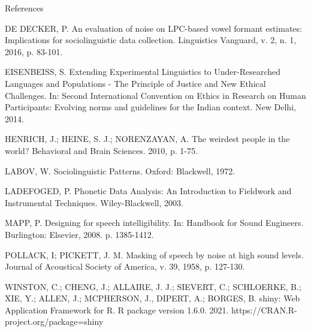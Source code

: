 \vspace{1cm}

References

DE DECKER, P. An evaluation of noise on LPC-based vowel formant estimates: Implications for sociolinguistic data collection. Linguistics Vanguard, v. 2, n. 1, 2016, p. 83-101. 

EISENBEISS, S. Extending Experimental Linguistics to Under-Researched Languages and Populations - The Principle of Justice and New Ethical Challenges. In: Second International Convention on Ethics in Research on Human Participants: Evolving norms and guidelines for the Indian context. New Delhi, 2014.

HENRICH, J.; HEINE, S. J.; NORENZAYAN, A. The weirdest people in the world? Behavioral and Brain Sciences. 2010, p. 1-75.

LABOV, W. Sociolinguistic Patterns. Oxford: Blackwell, 1972.

LADEFOGED, P. Phonetic Data Analysis: An Introduction to Fieldwork and Instrumental Techniques. Wiley-Blackwell, 2003.

MAPP, P. Designing for speech intelligibility. In: Handbook for Sound Engineers. Burlington: Elsevier, 2008. p. 1385-1412.

POLLACK, I; PICKETT, J. M. Masking of speech by noise at high sound levels. Journal of Acoustical Society of America, v. 39, 1958, p. 127-130. 

WINSTON, C.; CHENG, J.; ALLAIRE, J. J.; SIEVERT, C.; SCHLOERKE, B.; XIE, Y.; ALLEN, J.; MCPHERSON, J., DIPERT, A.; BORGES, B. shiny: Web Application Framework for R. R package version 1.6.0. 2021. https://CRAN.R-project.org/package=shiny
